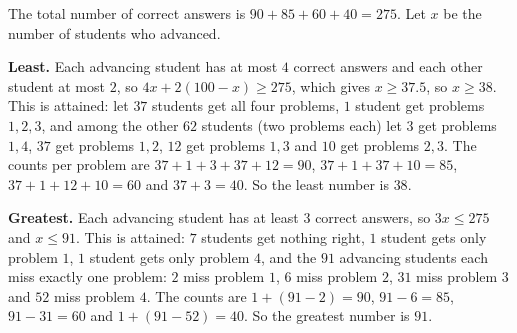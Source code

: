 The total number of correct answers is $90+85+60+40=275$. Let $x$ be the number of students who advanced.

\textbf{Least.} Each advancing student has at most $4$ correct answers and each other student at most $2$, so $4x+2(100-x)\ge275$, which gives $x\ge37.5$, so $x\ge38$. This is attained: let $37$ students get all four problems, $1$ student get problems $1,2,3$, and among the other $62$ students (two problems each) let $3$ get problems $1,4$, $37$ get problems $1,2$, $12$ get problems $1,3$ and $10$ get problems $2,3$. The counts per problem are $37+1+3+37+12=90$, $37+1+37+10=85$, $37+1+12+10=60$ and $37+3=40$. So the least number is $\boxed{38}$.

\textbf{Greatest.} Each advancing student has at least $3$ correct answers, so $3x\le275$ and $x\le91$. This is attained: $7$ students get nothing right, $1$ student gets only problem $1$, $1$ student gets only problem $4$, and the $91$ advancing students each miss exactly one problem: $2$ miss problem $1$, $6$ miss problem $2$, $31$ miss problem $3$ and $52$ miss problem $4$. The counts are $1+(91-2)=90$, $91-6=85$, $91-31=60$ and $1+(91-52)=40$. So the greatest number is $\boxed{91}$.
